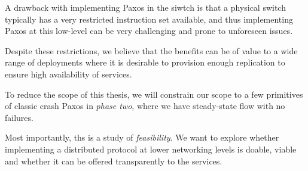 A drawback with implementing Paxos in the siwtch is that a physical switch
typically has a very restricted instruction set available, and thus
implementing Paxos at this low-level can be very challenging and prone to
unforeseen issues.

Despite these restrictions, we believe that the benefits can be of value to
a wide range of deployments where it is desirable to provision enough
replication to ensure high availability of services.

To reduce the scope of this thesis,
we will constrain our scope to a few primitives of
classic crash Paxos in \textit{phase two},
where we have steady-state
flow with no failures.

Most importantly, ths is a study of \textit{feasibility}.  We want to
explore whether implementing a distributed protocol at lower networking
levels is doable, viable and whether it can be offered transparently to the
services.

